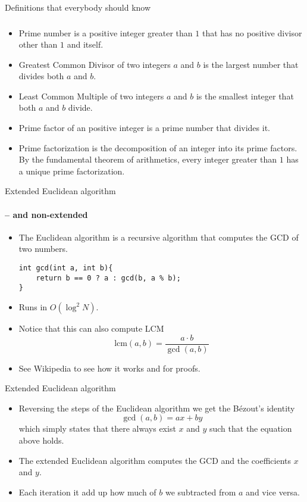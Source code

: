 \documentclass[10pt]{beamer}
\newcommand{\bi}{\begin{itemize}}
\newcommand{\ei}{\end{itemize}}
\begin{document}
\begin{frame}{Definitions that everybody should know}
  \frametitle{\insertsubsection}
  \vspace{15pt}
  \bi
    \item {\color{hilight}Prime number} is a positive integer greater than $1$
      that has no positive divisor other than $1$ and itself.
    \item {\color{hilight}Greatest Common Divisor} of two integers $a$ and $b$ is the
      largest number that divides both $a$ and $b$.
    \item {\color{hilight}Least Common Multiple} of two integers $a$ and $b$ is
      the smallest integer that both $a$ and $b$ divide.
    \item {\color{hilight}Prime factor} of an positive integer is a prime number that divides it.
    \item {\color{hilight}Prime factorization} is the decomposition of an
      integer into its prime factors. By the fundamental theorem of
      arithmetics, every integer greater than $1$ has a unique prime
      factorization.
  \ei
\end{frame}

\begin{frame}[fragile]{Extended Euclidean algorithm}
  \vspace{20pt}
  \framesubtitle{-- and non-extended}
  \bi
    \item The Euclidean algorithm is a recursive algorithm that computes the GCD of two numbers.
      \begin{verbatim}
int gcd(int a, int b){
    return b == 0 ? a : gcd(b, a % b);
}
    \end{verbatim}
    \item Runs in $O(\log^2 N)$.
    \item Notice that this can also compute LCM
      \[
        \text{lcm}(a, b) = \frac{a\cdot b}{\gcd(a,b)}
      \]
    \item See Wikipedia to see how it works and for proofs.
  \ei
\end{frame}

\begin{frame}[fragile]{Extended Euclidean algorithm}
  \vspace{20pt}
  \bi
    \item Reversing the steps of the Euclidean algorithm we get the B\'ezout's identity
      \[
        \gcd(a, b) = ax + by
      \]
    which simply states that there always exist $x$ and $y$ such that the equation above holds.
    \item The extended Euclidean algorithm computes the GCD and the coefficients $x$ and $y$.
    \item Each iteration it add up how much of $b$ we subtracted from $a$ and vice versa.
  \ei
\end{frame}
\end{document}
